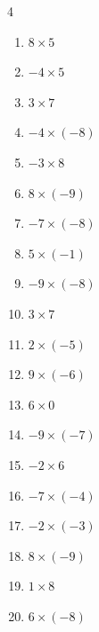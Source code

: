 \begin{multicols}{4}
\begin{enumerate}
  \item $8\times 5$
        \phantom{$=40$}

  \item $-4\times 5$
        \phantom{$=-20$}

  \item $3\times 7$
        \phantom{$=21$}

  \item $-4\times (-8)$
        \phantom{$=32$}

  \item $-3\times 8$
        \phantom{$=-24$}

  \item $8\times (-9)$
        \phantom{$=-72$}

  \item $-7\times (-8)$
        \phantom{$=56$}

  \item $5\times (-1)$
        \phantom{$=-5$}

  \item $-9\times (-8)$
        \phantom{$=72$}

  \item $3\times 7$
        \phantom{$=21$}

  \item $2\times (-5)$
        \phantom{$=-10$}

  \item $9\times (-6)$
        \phantom{$=-54$}

  \item $6\times 0$
        \phantom{$=0$}

  \item $-9\times (-7)$
        \phantom{$=63$}

  \item $-2\times 6$
        \phantom{$=-12$}

  \item $-7\times (-4)$
        \phantom{$=28$}

  \item $-2\times (-3)$
        \phantom{$=6$}

  \item $8\times (-9)$
        \phantom{$=-72$}

  \item $1\times 8$
        \phantom{$=8$}

\columnbreak %

  \item $6\times (-8)$
        \phantom{$=-48$}


\end{enumerate}
\end{multicols}

